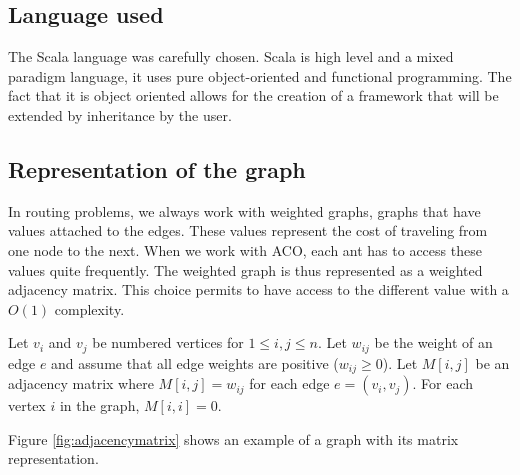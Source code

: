 \subsection{Language used}
The Scala language was carefully chosen. Scala is high level and a mixed paradigm language, it uses pure object-oriented and functional programming. The fact that it is object oriented allows for the creation of a framework that will be extended by inheritance by the user.

\subsection{Representation of the graph}
In routing problems, we always work with weighted graphs, graphs that have values attached to the edges. These values represent the cost of traveling from one node to the next. When we work with ACO, each ant has to access these values quite frequently. The weighted graph is thus represented as a weighted adjacency matrix. This choice permits to have access to the different value with a $O(1)$ complexity.

Let $v_i$ and $v_j$ be numbered vertices for $1\leq i,j\leq n$. Let $w_{ij}$ be the weight of an edge $e$ and assume that all edge weights are positive ($w_{ij}\geq 0$). Let $M[i,j]$ be an adjacency matrix where $M[i,j] = w_{ij}$ for each edge $e=(v_i,v_j)$. For each vertex $i$ in the graph, $M[i,i]=0$. 

Figure \ref{fig:adjacencymatrix} shows an example of a graph with its matrix representation.

